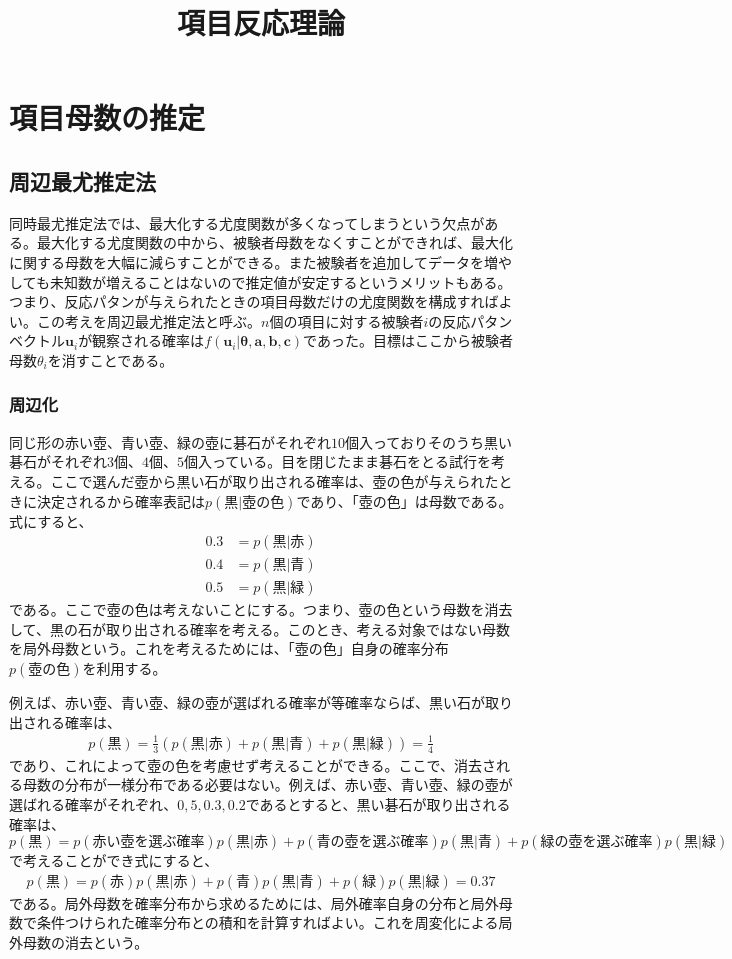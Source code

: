 \documentclass[12pt]{jarticle}
\title{項目反応理論}
\begin{document}
\maketitle
\setcounter{section}{3}
\section{項目母数の推定}
\setcounter{subsection}{1}
\subsection{周辺最尤推定法}
同時最尤推定法では、最大化する尤度関数が多くなってしまうという欠点がある。最大化する尤度関数の中から、被験者母数をなくすことができれば、最大化に関する母数を大幅に減らすことができる。また被験者を追加してデータを増やしても未知数が増えることはないので推定値が安定するというメリットもある。つまり、反応パタンが与えられたときの項目母数だけの尤度関数を構成すればよい。この考えを周辺最尤推定法と呼ぶ。$n$個の項目に対する被験者$i$の反応パタンベクトル$\boldsymbol{u}_i$が観察される確率は$f(\boldsymbol{u}_i|\boldsymbol{\theta},\boldsymbol{a,b,c})$であった。目標はここから被験者母数$\theta_i$を消すことである。
\subsubsection{周辺化}
同じ形の赤い壺、青い壺、緑の壺に碁石がそれぞれ$10$個入っておりそのうち黒い碁石がそれぞれ$3$個、$4$個、$5$個入っている。目を閉じたまま碁石をとる試行を考える。ここで選んだ壺から黒い石が取り出される確率は、壺の色が与えられたときに決定されるから確率表記は$\displaystyle p(黒|壺の色)$であり、「壺の色」は母数である。式にすると、
\begin{align*}
  \label{00}
  \displaystyle 0.3 &= p(黒|赤) \tag{4.15}\\
  0.4 &= p(黒|青) \tag{4.16} \\
  0.5 &=  p(黒|緑)\tag{4.17}
\end{align*}
である。ここで壺の色は考えないことにする。つまり、壺の色という母数を消去して、黒の石が取り出される確率を考える。このとき、考える対象ではない母数を局外母数という。これを考えるためには、「壺の色」自身の確率分布$p(壺の色)$を利用する。

例えば、赤い壺、青い壺、緑の壺が選ばれる確率が等確率ならば、黒い石が取り出される確率は、
\begin{align}
  \label{01}
  \displaystyle p(黒) = \frac{1}{3}(p(黒|赤) + p(黒|青) +p(黒|緑) ) = \frac{1}{4} \tag{4.18}
\end{align}
であり、これによって壺の色を考慮せず考えることができる。ここで、消去される母数の分布が一様分布である必要はない。例えば、赤い壺、青い壺、緑の壺が選ばれる確率がそれぞれ、$0,5,0.3,0.2$であるとすると、黒い碁石が取り出される確率は、$\displaystyle  p(黒) = p(赤い壺を選ぶ確率)p(黒|赤) + p(青の壺を選ぶ確率)p(黒|青) + p(緑の壺を選ぶ確率)p(黒|緑) $で考えることができ式にすると、
\begin{align}
  \label{02}
  \displaystyle  p(黒) = p(赤)p(黒|赤) + p(青)p(黒|青) + p(緑)p(黒|緑)  = 0.37 \tag{4.19}
\end{align}
である。局外母数を確率分布から求めるためには、局外確率自身の分布と局外母数で条件つけられた確率分布との積和を計算すればよい。これを周変化による局外母数の消去という。
\end{document}

